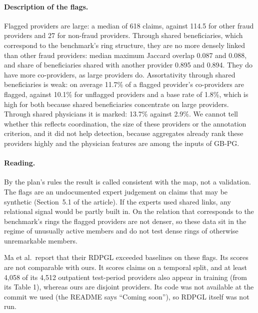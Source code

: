 \documentclass[pdflatex,sn-vancouver-num]{sn-jnl}
\newcommand{\MainSecData}{5.1}
\begin{document}
\paragraph{Description of the flags.} Flagged providers are large: a median of 618 claims, against 114.5 for other fraud
providers and 27 for non-fraud providers. Through shared beneficiaries, which correspond to the benchmark's ring
structure, they are no more densely linked than other fraud providers: median maximum Jaccard overlap 0.087 and 0.088,
and share of beneficiaries shared with another provider 0.895 and 0.894. They do have more co-providers, as large
providers do. Assortativity through shared beneficiaries is weak: on average 11.7\% of a flagged provider's co-providers
are flagged, against 10.1\% for unflagged providers and a base rate of 1.8\%, which is high for both because shared
beneficiaries concentrate on large providers. Through shared physicians it is marked: 13.7\% against 2.9\%. We cannot
tell whether this reflects coordination, the size of these providers or the annotation criterion, and it did not help
detection, because aggregates already rank these providers highly and the physician features are among the inputs of GB-PG.

\paragraph{Reading.} By the plan's rules the result is called consistent with the map, not a validation. The flags are an
undocumented expert judgement on claims that may be synthetic (Section~\MainSecData{} of the article). If the experts
used shared links, any relational signal would be partly built in. On the relation that corresponds to the benchmark's
rings the flagged providers are not denser, so these data sit in the regime of unusually active members and do not
test dense rings of otherwise unremarkable members.

Ma et al.\ report that their RDPGL exceeded baselines on these flags. Its scores are not comparable with ours. It scores
claims on a temporal split, and at least 4,058 of its 4,512 outpatient test-period providers also appear in training
(from its Table 1), whereas ours are disjoint providers. Its code was not available at the commit we used (the README
says ``Coming soon''), so RDPGL itself was not run.
\end{document}
